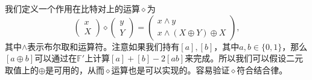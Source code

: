 我们定义一个作用在比特对上的运算$\diamond$为
$$
\begin{pmatrix}
x\\X
\end{pmatrix}
\diamond
\begin{pmatrix}
y\\Y
\end{pmatrix}
=
\begin{pmatrix}
x\wedge y\\
x\wedge(X\oplus Y)\oplus X
\end{pmatrix},
$$
其中$\wedge$表示布尔取和运算符。注意如果我们持有$[a],[b]$，其中$a,b\in \{0,1\}$，那么$[a\oplus b]$可以通过在$\mathbb{F}'$上计算$[a]+[b]-2[ab]$来完成。所以我们可以假设二元取值上的$\oplus$是可用的，从而$\diamond$运算也是可以实现的。容易验证$\diamond$符合结合律。
\newline
\newline
{}